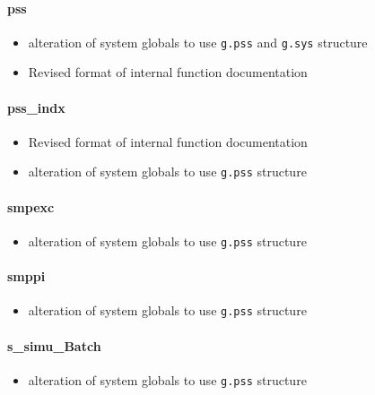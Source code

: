 \documentclass[12pt]{article}
\begin{document}
\paragraph{pss}
	\begin{itemize}
		\item alteration of system globals to use \verb|g.pss| and \verb|g.sys| structure
		\item Revised format of internal function documentation
	\end{itemize}
	
\paragraph{pss\_indx}
	\begin{itemize}
		\item Revised format of internal function documentation
		\item alteration of system globals to use \verb|g.pss| structure
	\end{itemize}
	
\paragraph{smpexc}
	\begin{itemize}
		\item alteration of system globals to use \verb|g.pss| structure
	\end{itemize}
	
\paragraph{smppi}
	\begin{itemize}
		\item alteration of system globals to use \verb|g.pss| structure
	\end{itemize}

\paragraph{s\_simu\_Batch}
	\begin{itemize}
		\item alteration of system globals to use \verb|g.pss| structure
	\end{itemize}
\end{document}
